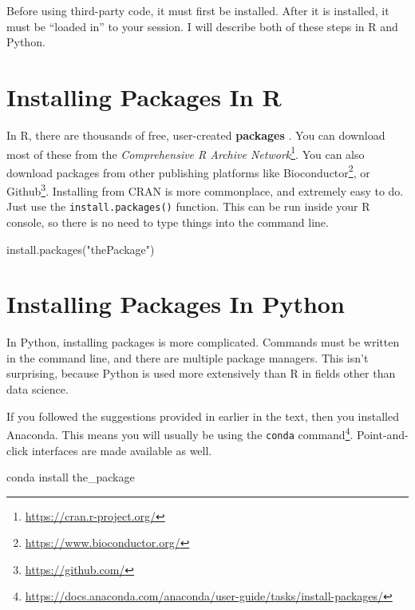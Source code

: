 \documentclass[
  12pt,
  krantz2]{krantz}
\makeatletter
\newenvironment{Shaded}{\begin{snugshade}}{\end{snugshade}}
\newcommand{\ExtensionTok}[1]{#1}
\newcommand{\FunctionTok}[1]{\textcolor[rgb]{0,0,0}{#1}}
\newcommand{\NormalTok}[1]{#1}
\newcommand{\StringTok}[1]{\textcolor[rgb]{0.5,0.5,0.5}{#1}}
\renewcommand{\href}[2]{#2\footnote{\url{#1}}}
\newenvironment{kframe}{%
\medskip{}
\setlength{\fboxsep}{.8em}
 \def\at@end@of@kframe{}%
 \ifinner\ifhmode%
  \def\at@end@of@kframe{\end{minipage}}%
  \begin{minipage}{\columnwidth}%
 \fi\fi%
 \def\FrameCommand##1{\hskip\@totalleftmargin \hskip-\fboxsep
 \colorbox{shadecolor}{##1}\hskip-\fboxsep
     \hskip-\linewidth \hskip-\@totalleftmargin \hskip\columnwidth}%
 \MakeFramed {\advance\hsize-\width
   \@totalleftmargin\z@ \linewidth\hsize
   \@setminipage}}%
 {\par\unskip\endMakeFramed%
 \at@end@of@kframe}
\renewenvironment{Shaded}{\begin{kframe}}{\end{kframe}}
\makeatother
\begin{document}
Before using third-party code, it must first be installed. After it is installed, it must be ``loaded in'' to your session. I will describe both of these steps in R and Python.

\hypertarget{installing-packages-in-r}{%
\section{Installing Packages In R}\label{installing-packages-in-r}}

In R, there are thousands of free, user-created \textbf{packages} \citep{r_for_everyone}. You can download most of these from the \href{https://cran.r-project.org/}{\emph{Comprehensive R Archive Network}}. You can also download packages from other publishing platforms like \href{https://www.bioconductor.org/}{Bioconductor}, or \href{https://github.com/}{Github}. Installing from CRAN is more commonplace, and extremely easy to do. Just use the \texttt{install.packages()} function. This can be run inside your R console, so there is no need to type things into the command line.

\begin{Shaded}
\begin{Highlighting}[]
\FunctionTok{install.packages}\NormalTok{(}\StringTok{"thePackage"}\NormalTok{)}
\end{Highlighting}
\end{Shaded}

\hypertarget{installing-packages-in-python}{%
\section{Installing Packages In Python}\label{installing-packages-in-python}}

In Python, installing packages is more complicated. Commands must be written in the command line, and there are multiple package managers. This isn't surprising, because Python is used more extensively than R in fields other than data science.

If you followed the suggestions provided in earlier in the text, then you installed Anaconda. This means you will usually be using the \href{https://docs.anaconda.com/anaconda/user-guide/tasks/install-packages/}{\texttt{conda} command}. Point-and-click interfaces are made available as well.

\begin{Shaded}
\begin{Highlighting}[]
\ExtensionTok{conda}\NormalTok{ install the\_package}
\end{Highlighting}
\end{Shaded}
\end{document}
